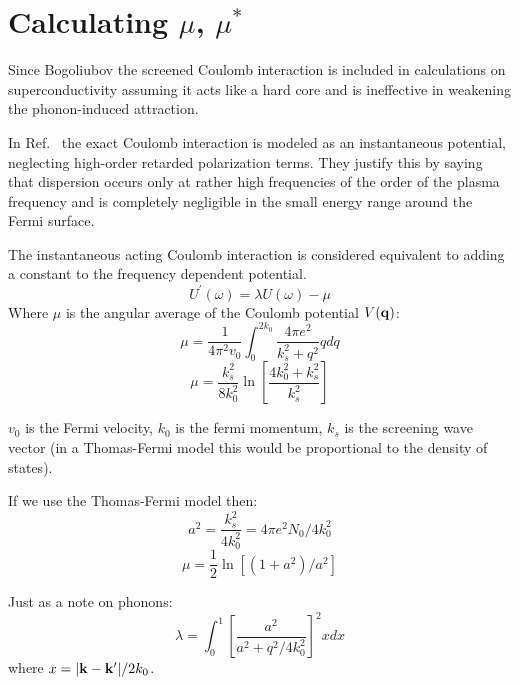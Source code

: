 \documentclass{article}
\def\k{{\bf k}}
\def\q{{\bf q}}
\begin{document}
\section{Calculating $\mu$, $\mu^{*}$}
Since Bogoliubov the screened Coulomb interaction is included in calculations on 
superconductivity assuming it acts like a hard core and 
is ineffective in weakening the phonon-induced attraction.

In Ref.~\cite{morel62} the exact Coulomb interaction is modeled 
as an instantaneous potential, 
neglecting high-order retarded polarization terms. They justify this 
by saying that dispersion occurs only at rather
high frequencies of the order of the plasma frequency 
and is completely negligible in the
small energy range around the Fermi surface.

The instantaneous acting Coulomb interaction is considered 
equivalent to adding a constant to the frequency dependent potential.
%
\begin{equation}
U^{'}(\omega) = \lambda U(\omega) - \mu
\end{equation}
%
Where $\mu$ is the angular average of the Coulomb potential $V(\q)$:
%
\begin{equation}
\mu=\frac{1}{4\pi^{2}v_{0}}\int_{0}^{2k_{0}}\frac{4\pi e^{2}}{k_{s}^{2}+q^{2}}qdq
\end{equation}
%
\begin{equation}
\mu=\frac{k_{s}^{2}}{8k_{0}^{2}}\ln\left[\frac{4k_{0}^{2}+k_{s}^{2}}{k_{s}^{2}}\right]
\end{equation}

$v_{0}$ is the Fermi velocity, $k_{0}$ is the fermi momentum, $k_{s}$ is the screening
wave vector (in a Thomas-Fermi model this would be proportional to the density of states).

If we use the Thomas-Fermi model then: 
%
\begin{equation}
a^{2} = \frac{k^{2}_{s}}{4k^{2}_{0}} = 4\pi e^{2} N_{0}/4k^{2}_{0}
\end{equation}
%
\begin{equation}
\mu = \frac{1}{2} \ln \left[(1+a^{2})/a^{2}\right]
\end{equation}

Just as a note on phonons:
%
\begin{equation}
\lambda = \int_{0}^{1}\left[ \frac{a^{2}}{a^{2} + q^{2}/4k^{2}_{0}}\right]^{2} x dx
\end{equation}
%
where $x=|\k-\k'|/2k_{0}$.
\end{document}
